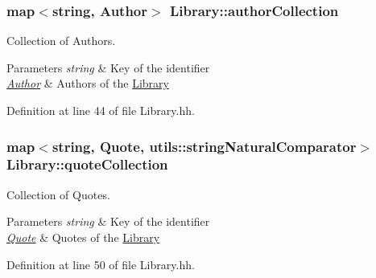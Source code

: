 \subsubsection[{\texorpdfstring{author\+Collection}{authorCollection}}]{\setlength{\rightskip}{0pt plus 5cm}map$<$string, {\bf Author}$>$ Library\+::author\+Collection\hspace{0.3cm}{\ttfamily [private]}}\hypertarget{class_library_a7a6958a0dc85a1c816ca35727306cd62}{}\label{class_library_a7a6958a0dc85a1c816ca35727306cd62}


Collection of Authors. 


\begin{DoxyParams}{Parameters}
{\em string} & Key of the identifier \\
\hline
{\em \hyperlink{class_author}{Author}} & Authors of the \hyperlink{class_library}{Library} \\
\hline
\end{DoxyParams}


Definition at line 44 of file Library.\+hh.

\subsubsection[{\texorpdfstring{quote\+Collection}{quoteCollection}}]{\setlength{\rightskip}{0pt plus 5cm}map$<$string, {\bf Quote}, {\bf utils\+::string\+Natural\+Comparator}$>$ Library\+::quote\+Collection\hspace{0.3cm}{\ttfamily [private]}}\hypertarget{class_library_a0f9136df5fc6e8901cb8524e026cb147}{}\label{class_library_a0f9136df5fc6e8901cb8524e026cb147}


Collection of Quotes. 


\begin{DoxyParams}{Parameters}
{\em string} & Key of the identifier \\
\hline
{\em \hyperlink{class_quote}{Quote}} & Quotes of the \hyperlink{class_library}{Library} \\
\hline
\end{DoxyParams}


Definition at line 50 of file Library.\+hh.

